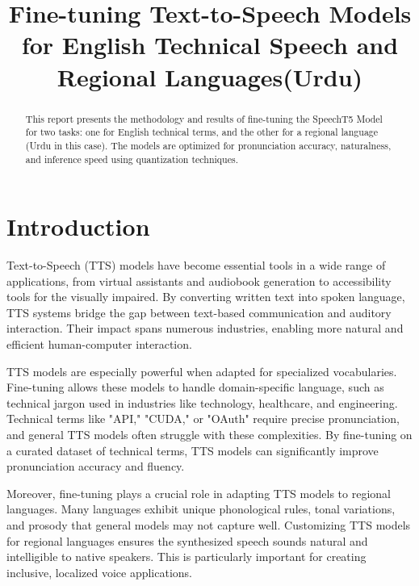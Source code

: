 \documentclass[conference]{IEEEtran}
\begin{document}
\title{Fine-tuning Text-to-Speech Models for English Technical
Speech and Regional Languages(Urdu)}

\author{
}

\maketitle

\begin{abstract}
 This report presents the methodology and results of fine-tuning the SpeechT5 Model for two tasks: one for English technical terms, and the other for a regional language (Urdu in this case). The models are optimized for pronunciation accuracy, naturalness, and inference speed using quantization techniques.
\end{abstract}


\section{Introduction}
Text-to-Speech (TTS) models have become essential tools in a wide range of applications, from virtual assistants and audiobook generation to accessibility tools for the visually impaired. By converting written text into spoken language, TTS systems bridge the gap between text-based communication and auditory interaction. Their impact spans numerous industries, enabling more natural and efficient human-computer interaction.

TTS models are especially powerful when adapted for specialized vocabularies. Fine-tuning allows these models to handle domain-specific language, such as technical jargon used in industries like technology, healthcare, and engineering. Technical terms like "API," "CUDA," or "OAuth" require precise pronunciation, and general TTS models often struggle with these complexities. By fine-tuning on a curated dataset of technical terms, TTS models can significantly improve pronunciation accuracy and fluency.

Moreover, fine-tuning plays a crucial role in adapting TTS models to regional languages. Many languages exhibit unique phonological rules, tonal variations, and prosody that general models may not capture well. Customizing TTS models for regional languages ensures the synthesized speech sounds natural and intelligible to native speakers. This is particularly important for creating inclusive, localized voice applications.
\end{document}

